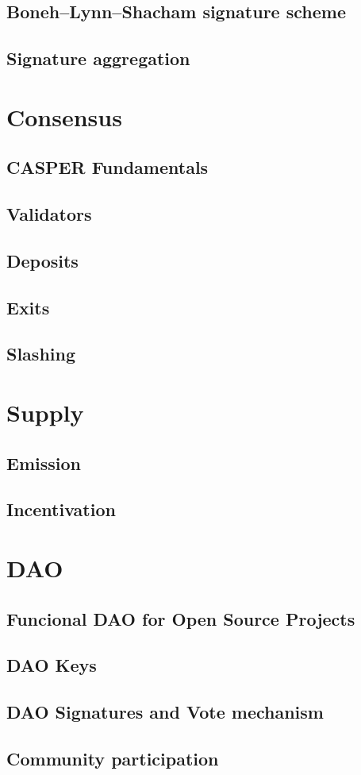 \documentclass{article}
\begin{document}
	    \subsection{Boneh–Lynn–Shacham signature scheme}	
	    \subsection{Signature aggregation}	
	    
	\section{Consensus}
	    \subsection{CASPER Fundamentals}	
	    \subsection{Validators}		    
	    \subsection{Deposits}	
	    \subsection{Exits}		    
	    \subsection{Slashing}	
	    
	\section{Supply}
	    \subsection{Emission}	
	    \subsection{Incentivation}		    
	    
	\section{DAO}
	    \subsection{Funcional DAO for Open Source Projects}	
	    \subsection{DAO Keys}		    
	    \subsection{DAO Signatures and Vote mechanism}		    
	    \subsection{Community participation}		    

	
\end{document}
